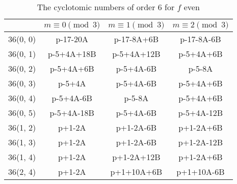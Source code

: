 \documentclass[letter]{ieice}
\begin{document}
\begin{table}[tb]
\caption{The cyclotomic numbers of order 6 for $ f $ even}
\label{lab-table-formulae-for-cn-order6}
{\renewcommand{\tabcolsep}{0.15cm}
\begin{center}
\begin{tabular}{|c|c|c|c|}
\hline
& $ m\equiv 0\pmod 3 $    &   $ m\equiv 1\pmod 3 $ & $ m\equiv 2\pmod 3 $\\
\hline
36(0, 0)&	p-17-20A	&	p-17-8A+6B	    &	p-17-8A-6B\\
\hline
36(0, 1)&	p-5+4A+18B	&	p-5+4A+12B	    &	p-5+4A+6B\\
\hline
36(0, 2)&	p-5+4A+6B	&	p-5+4A-6B	    &	p-5-8A\\
\hline
36(0, 3)&	p-5+4A  	&	p-5+4A-6B 	    &	p-5+4A+6B\\
\hline
36(0, 4)&	p-5+4A-6B	&	p-5-8A   	    &	p-5+4A+6B\\
\hline
36(0, 5)&	p-5+4A-18B	&	p-5+4A-6B	    &	p-5+4A-12B\\
\hline
36(1, 2)&	p+1-2A  	&	p+1-2A-6B	    &	p+1-2A+6B\\
\hline
36(1, 3)&	p+1-2A  	&	p+1-2A-6B	    &	p+1-2A-12B\\
\hline
36(1, 4)&	p+1-2A  	&	p+1-2A+12B	    &	p+1-2A+6B\\
\hline
36(2, 4)&	p+1-2A  	&	p+1+10A+6B	    &	p+1+10A-6B\\
\hline
\end{tabular}
\end{center}
}
\end{table}
\end{document}
